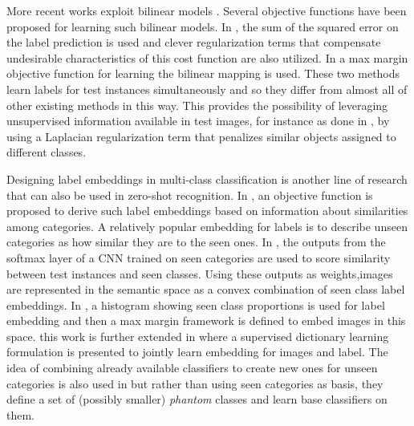 \documentclass[letterpaper]{article}
\begin{document}
More recent works exploit bilinear models \cite{Yu2013,devise,convex,sse,emb15,semi15}.
 Several objective functions have been proposed for learning such bilinear models.
In \cite{emb15}, the sum of the squared error on the label prediction is used and clever regularization
 terms that compensate undesirable characteristics of this cost function are also utilized.
In \cite{li15max,semi15} a max margin objective function for learning the bilinear mapping is used.
 These two methods learn labels for test instances simultaneously and so they differ from almost all of other existing methods in this way.
 This provides the possibility of
leveraging unsupervised information available in test images, for instance as done in \cite{semi15},
 by using a Laplacian regularization term that penalizes similar objects assigned to different classes.

Designing label embeddings in multi-class classification
is another line of research that can also be used in zero-shot recognition.
 In \cite{Yu2013}, an objective function is proposed to derive such label embeddings based on information about similarities among categories.
A relatively popular embedding for labels is to describe unseen categories as how similar they are to the seen ones.
In \cite{convex}, the outputs from the softmax layer of a CNN trained on seen categories are used to score similarity between test instances and seen classes.
Using these outputs as weights,images are represented in the semantic space as a convex combination of seen class label embeddings.
In \cite{sse}, a histogram showing seen class proportions is used for label embedding and then a max margin framework is defined to embed images in this space.
this work is further extended in \cite{agnostic} where a supervised dictionary learning formulation is
presented to jointly learn embedding for images and label.
%
 The idea of combining already available classifiers to create new ones for unseen categories is also used in \cite{Synthesized}
 but rather than using seen categories as basis, they define a set of (possibly smaller) \textit{phantom} classes and learn base classifiers on them.
\end{document}
